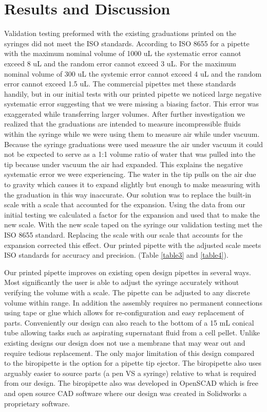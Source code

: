 \documentclass[10pt,letterpaper]{article}
\begin{document}
\section*{Results and Discussion}
Validation testing preformed with the existing graduations printed on the syringes did not meet the ISO standards.
According to ISO 8655 for a pipette with the maximum nominal volume of 1000 uL the systematic error cannot exceed 8 uL and the random error cannot exceed 3 uL.
For the maximum nominal volume of 300 uL the systemic error cannot exceed 4 uL and the random error cannot exceed 1.5 uL.
The commercial pipettes met these standards handily, but in our initial tests with our printed pipette we noticed large negative systematic error suggesting that we were missing a biasing factor. 
This error was exaggerated while transferring larger volumes.
After further investigation we realized that the graduations are intended to measure incompressible fluids within the syringe while we were using them to measure air while under vacuum.
Because the syringe graduations were used measure the air under vacuum it could not be expected to serve as a 1:1 volume ratio of water that was pulled into the tip because under vacuum the air had expanded.
This explains the negative systematic error we were experiencing.
The water in the tip pulls on the air due to gravity which causes it to expand slightly but enough to make measuring with the graduation in this way inaccurate.
Our solution was to replace the built-in scale with a scale that accounted for the expansion.
Using the data from our initial testing we calculated a factor for the expansion and used that to make the new scale.
With the new scale taped on the syringe our validation testing met the ISO 8655 standard.
Replacing the scale with our scale that accounts for the expansion corrected this effect. 
Our printed pipette with the adjusted scale meets ISO standards for accuracy and precision. (Table \ref{table3} and \ref{table4}).

Our printed pipette improves on existing open design pipettes in several ways. 
Most significantly the user is able to adjust the syringe accurately without verifying the volume with a scale.
The pipette can be adjusted to any discrete volume within range.
In addition the assembly requires no permanent connections using tape or glue which allows for re-configuration and easy replacement of parts.
Conveniently our design can also reach to the bottom of a 15 mL conical tube allowing tasks such as aspirating supernatant fluid from a cell pellet.
Unlike existing designs our design does not use a membrane that may wear out and require tedious replacement.
The only major limitation of this design compared to the biropipette is the option for a pipette tip ejector.
The biropipette also uses arguably easier to source parts (a pen VS a syringe) relative to what is required from our design.
The biropipette also was developed in OpenSCAD which is free and open source CAD software where our design was created in Solidworks a proprietary software. 
\end{document}
